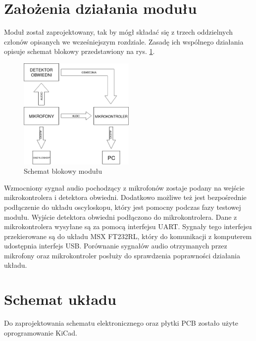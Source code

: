 \documentclass[eng,printmode]{mgr}
\begin{document}
 \section{Założenia działania modułu}
  Moduł został zaprojektowany, tak by mógł składać się z trzech oddzielnych członów opisanych we wcześniejszym rozdziale. Zasadę ich wspólnego działania opisuje schemat blokowy przedstawiony na rys. \ref{fig-schematblokowy}.
  \begin{figure}[!ht]

    \centering

  \includegraphics[width=0.5\textwidth, angle=0]{diagram.png}

    \caption{Schemat blokowy modułu}
 \label{fig-schematblokowy}
    

\end{figure}
%
Wzmocniony sygnał audio pochodzący z mikrofonów zostaje podany na wejście mikrokontrolera i detektora obwiedni. Dodatkowo możliwe też jest bezpośrednie podłączenie do układu oscyloskopu, który jest pomocny podczas fazy testowej modułu. Wyjście detektora obwiedni podłączono do mikrokontrolera. Dane z mikrokontrolera wysyłane są za pomocą interfejsu UART. Sygnały tego interfejsu przekierowane są do układu MSX FT232RL, który do komunikacji z komputerem udostępnia interfejs USB. Porównanie sygnałów audio otrzymanych przez mikrofony oraz mikrokontroler posłuży do sprawdzenia poprawności działania układu. 
\section{Schemat układu}
Do zaprojektowania schematu elektronicznego oraz płytki PCB zostało użyte oprogramowanie KiCad.
\end{document}
